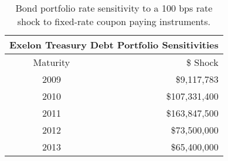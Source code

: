 \begin{table}[h]
	\centering
	\begin{tabular}{cr}
	\toprule
	\multicolumn{2}{c}{Exelon Treasury Debt Portfolio Sensitivities} \\
	\hline
Maturity & \$ Shock \\
\hline
2009 & \$9,117,783 \\
2010 & \$107,331,400 \\
2011 & \$163,847,500 \\
2012 & \$73,500,000 \\
2013 & \$65,400,000	\\
\bottomrule
	\end{tabular}
	\caption{Bond portfolio rate sensitivity to a 100 bps rate shock to fixed-rate coupon paying instruments.}
	\label{tab:rate_shocks}
\end{table}

